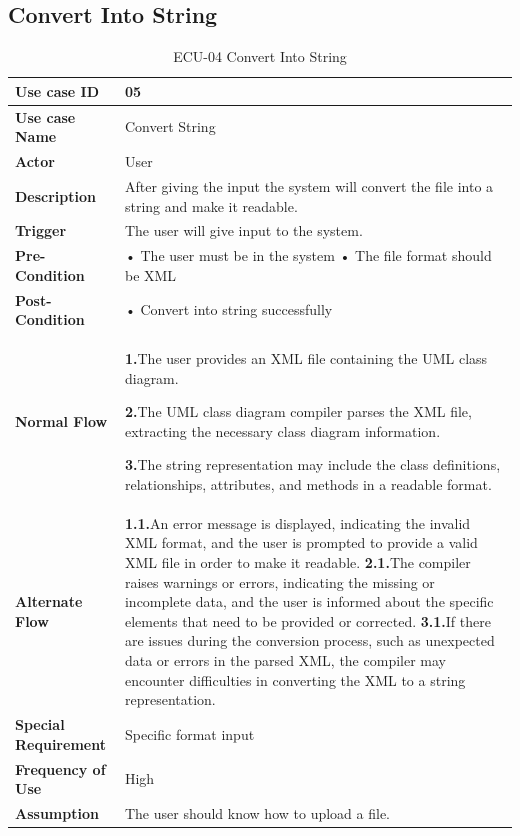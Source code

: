 \documentclass[12pt,a4paper]{article}
\begin{document}
\newpage  
    \subsection{Convert Into String}
    \begin{table}[h]
\caption{ECU-04 Convert Into String}
    \centering
    \begin{tabular}{|l|p{10cm}|}
    \hline
       \textbf{Use case ID}&05 \\ %
       \hline
       \textbf{Use case Name}&Convert String \\ %
       \hline
       \textbf{Actor}&User \\ %
       \hline
       \textbf{Description}&After giving the input the system will convert the file into a string and make it readable.\\ %
       \hline

    \textbf{Trigger}&The user will give input to the system. \\ %
        \hline
       \textbf{Pre-Condition}&
• The user must be in the system
\newline• The file format should be XML
\\ %
        \hline
       \textbf{Post-Condition}&• Convert into string successfully
 \\ %
        \hline
       \textbf{Normal Flow}&\textbf{1.}The user provides an XML file containing the UML class diagram.

\textbf{2.}The UML class diagram compiler parses the XML file, extracting the necessary class diagram information.

\textbf{3.}The string representation may include the class definitions, relationships, attributes, and methods in a readable format. \\ %
\hline
       \textbf{Alternate Flow}&
       \textbf{1.1.}An error message is displayed, indicating the invalid XML format, and the user is prompted to provide a valid XML file in order to make it readable.
\newline\textbf{2.1.}The compiler raises warnings or errors, indicating the missing or incomplete data, and the user is informed about the specific elements that need to be provided or corrected.
\newline\textbf{3.1.}If there are issues during the conversion process, such as unexpected data or errors in the parsed XML, the compiler may encounter difficulties in converting the XML to a string representation.\\ %
        \hline
       \textbf{Special Requirement}&Specific format input \\ %
        \hline
       \textbf{Frequency of Use}&High \\ %
        \hline
       \textbf{Assumption}&The user should know how to upload a file.\\ %
       \hline
    \end{tabular} 
    \end{table}
\end{document}
